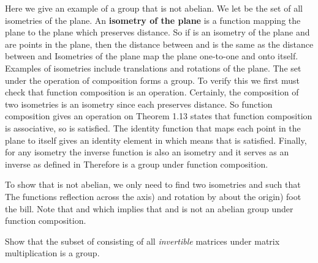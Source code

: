 \documentclass[11pt,oneside]{article}
\begin{document}
\begin{BookBody}
 Here we give an example of a group that is not abelian. We let  be the set of all isometries of the plane. An\textbf{ isometry of the plane} is a function mapping the plane to the plane which preserves distance. So if \BookInline{\phi } is an isometry of the plane and  are points in the plane, then the distance between  and  is the same as the distance between  and  Isometries of the plane map the plane one-to-one and onto itself. Examples of isometries include translations and rotations of the plane. The set  under the operation of composition forms a group. To verify this we first must check that function composition is an operation. Certainly, the composition of two isometries is an isometry since each preserves distance. So function composition gives an operation on  Theorem 1.13 states that function composition is associative, so  is satisfied. The identity function \BookInline{\iota } that maps each point  in the plane to itself gives an identity element in  which means that  is satisfied. Finally, for any isometry \BookInline{\phi,\allowbreak } the inverse function  is also an isometry and it serves as an inverse as defined in  Therefore  is a group under function composition.

To show that  is not abelian, we only need to find two isometries \BookInline{\phi } and \BookInline{\theta } such that  The functions reflection across the axis) and rotation by  about the origin) foot the bill. Note that   and  which implies that \BookInline{\phi \circ \theta \neq \theta \circ \phi } and  is not an abelian group under function composition. \BookEnd{\blacktriangle}

 Show that the subset  of  consisting of all\textit{ invertible}  matrices under matrix multiplication is a group.


\end{BookBody}
\end{document}
